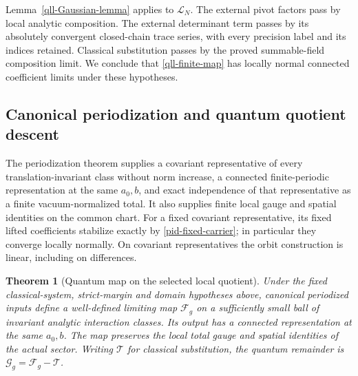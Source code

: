 \documentclass[11pt]{article}
\newtheorem{theorem}{Theorem}[section]
\theoremstyle{remark}
\begin{document}
Lemma~\ref{qll-Gaussian-lemma} applies to \(\mathcal L_N\).
The external pivot factors pass by local analytic composition.
The external determinant term passes by its absolutely
convergent closed-chain trace series, with every precision
label and its indices retained. Classical substitution passes
by the proved summable-field composition limit. We conclude
that \eqref{qll-finite-map} has locally normal connected
coefficient limits under these hypotheses.

\subsection{Canonical periodization and quantum quotient descent}
\label{qll-descent-section}

The periodization theorem supplies a covariant representative
of every translation-invariant class without norm increase,
a connected finite-periodic representation at the same
\(a_0,b\), and exact independence of that representative as
a finite vacuum-normalized total. It also supplies finite
local gauge and spatial identities on the common chart.
For a fixed covariant representative, its fixed lifted
coefficients stabilize exactly by
\eqref{pid-fixed-carrier}; in particular they converge locally
normally. On covariant representatives the orbit construction
is linear, including on differences.

\begin{theorem}[Quantum map on the selected local quotient]
\label{qll-descent-theorem}
Under the fixed classical-system, strict-margin and domain
hypotheses above, canonical periodized inputs define a
well-defined limiting map \(\mathcal F_g\) on a sufficiently
small ball of invariant analytic interaction classes.
Its output has a connected representation at the same
\(a_0,b\). The map preserves the local total gauge and spatial
identities of the actual sector. Writing \(\mathcal T\) for
classical substitution, the quantum remainder is
\(\mathcal G_g=\mathcal F_g-\mathcal T\).
\end{theorem}
\end{document}
